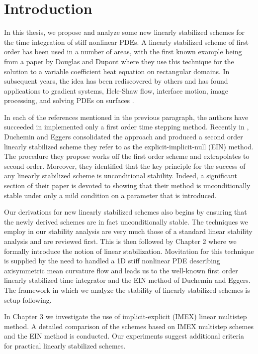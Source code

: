 \chapter{Introduction}
In this thesis, we propose and analyze some new linearly stabilized schemes for the time integration of stiff nonlinear PDEs. A linearly stabilized scheme of first order has been used in a number of areas, with the first known example being from a paper by Douglas and Dupont \cite{douglas1971alternating} where they use this technique for the solution to a variable coefficient heat equation on rectangular domains. In subsequent years, the idea has been rediscovered by others \cite{eyre1998unconditionally,smereka2003semi} and has found applications to gradient systems, Hele-Shaw flow, interface motion, image processing, and solving PDEs on surfaces \cite{eyre1998bunconditionally,salac2008local,glasner2002diffuse,schonlieb2011unconditionally,macdonald2009implicit}.

In each of the references mentioned in the previous paragraph, the authors have succeeded in implemented only a first order time stepping method. Recently in \cite{duchemin2014explicit},  Duchemin and Eggers consolidated the approach and produced a second order linearly stabilized scheme they refer to as the explicit-implicit-null (EIN) method. The procedure they propose works off the first order scheme and extrapolates to second order. Moreover, they identified that the key principle for the success of any linearly stabilized scheme is unconditional stability. Indeed, a significant section of their paper is devoted to showing that their method is unconditionally stable under only a mild condition on a parameter that is introduced.

Our derivations for new linearly stabilized schemes also begins by ensuring that the newly derived schemes are in fact unconditionally stable. The techniques we employ in our stability analysis are very much those of a standard linear stability analysis and are reviewed first. This is then followed by Chapter 2 where we formally introduce the notion of linear stabilization. Movitation for this technique is supplied by the need to handled a 1D stiff nonlinear PDE describing axisymmetric mean curvature flow and leads us to the well-known first order linearly stabilized time integrator and the EIN method of Duchemin and Eggers. The framework in which we analyze the stability of linearly stabilized schemes is setup following. 

In Chapter 3 we investigate the use of implicit-explicit (IMEX) linear multistep method. A detailed comparison of the schemes based on IMEX multistep schemes and the EIN method is conducted. Our experiments suggest additional criteria for practical linearly stabilized schemes. 



